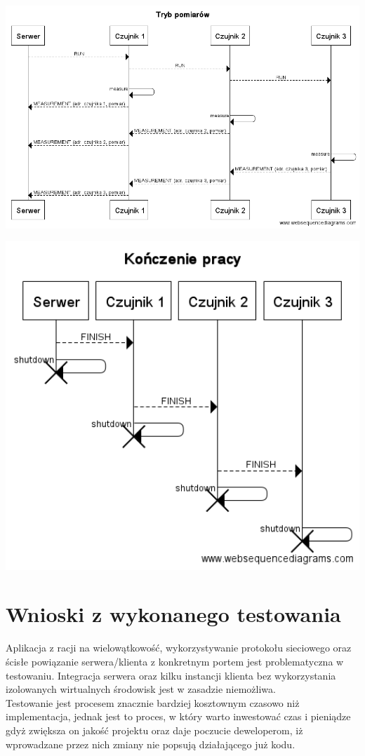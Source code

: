 \documentclass[a4paper,11pt]{article}
\begin{document}
\begin{center}
    \centerline{\includegraphics[width=1.4\textwidth]{measure_seq}}
    \centerline{\includegraphics[width=1.0\textwidth]{finish_seq}}
\end{center}

\section{Wnioski z wykonanego testowania}
Aplikacja z racji na wielowątkowość, wykorzystywanie protokołu sieciowego oraz ścisłe powiązanie serwera/klienta z konkretnym portem jest problematyczna w testowaniu. Integracja serwera oraz kilku instancji klienta bez wykorzystania izolowanych wirtualnych środowisk jest w zasadzie niemożliwa. \\
Testowanie jest procesem znacznie bardziej kosztownym czasowo niż implementacja, jednak jest to proces, w który warto inwestować czas i pieniądze gdyż zwiększa on jakość projektu oraz daje poczucie deweloperom, iż wprowadzane przez nich zmiany nie popsują działającego już kodu.
\end{document}
